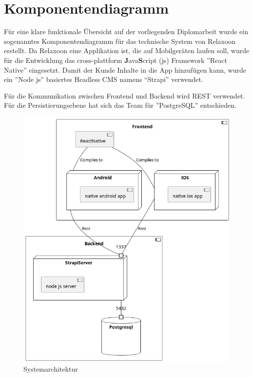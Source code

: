 \section{Komponentendiagramm}

Für eine klare funktionale Übersicht auf der vorliegenden Diplomarbeit
wurde ein sogenanntes Komponentendiagramm für das technische System von Relaxoon erstellt.
Da Relaxoon eine Applikation ist, die auf Mobilgeräten laufen soll,
wurde für die Entwicklung das cross-plattform \textbf{J}ava\textbf{S}cript  (js)
Framework ''React Native'' eingesetzt. Damit der Kunde Inhalte in die App hinzufügen kann,
wurde ein ''Node js'' basiertes Headless CMS
namens “Strapi” verwendet.

Für die Kommunikation zwischen Frontend und Backend wird REST verwendet.
Für die Persistierungsebene hat sich das Team für ''PostgreSQL'' entschieden.


\begin{figure}[H]
    \centering
    \includegraphics[width=\textwidth]{./pics/system-architektur.png}
    \caption{Systemarchitektur}
    \label{fig:Systemarchitektur}
\end{figure}